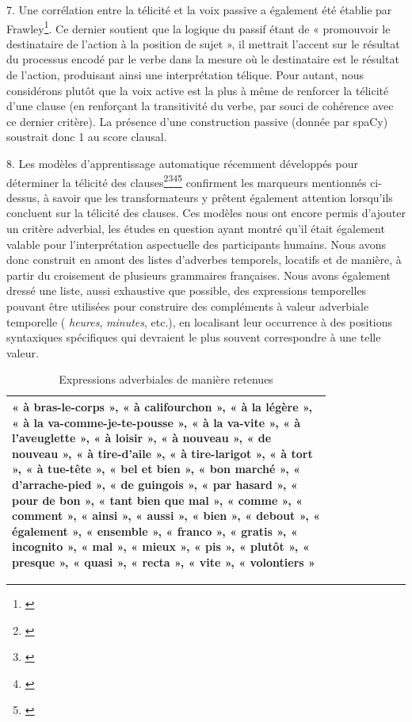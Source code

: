 7. Une corrélation entre la télicité et la voix passive a également été établie par Frawley\footnote{\cite{frawley_linguistic_1992}}. Ce dernier soutient que la logique du passif étant de « promouvoir le destinataire de l'action à la position de sujet », il mettrait l'accent sur le résultat du processus encodé par le verbe dans la mesure où le destinataire est le résultat de l'action, produisant ainsi une interprétation télique. Pour autant, nous considérons plutôt que la voix active est la plus à même de renforcer la télicité d'une clause (en renforçant la transitivité du verbe, par souci de cohérence avec ce dernier critère). La présence d'une construction passive (donnée par spaCy) soustrait donc 1 au score clausal.

8. Les modèles d'apprentissage automatique récemment développés pour déterminer la télicité des clauses\footnote{\cite{siegel_learning_2000}}\footnote{\cite{zarcone_computational_2008}}\footnote{\cite{friedrich_classification_2017}}\footnote{\cite{zhao_pretrained_2021}} confirment les marqueurs mentionnés ci-dessus, à savoir que les transformateurs y prêtent également attention lorsqu'ils concluent sur la télicité des clauses. Ces modèles nous ont encore permis d'ajouter un critère adverbial, les études en question ayant montré qu'il était également valable pour l'interprétation aspectuelle des participants humains. Nous avons donc construit en amont des listes d'adverbes temporels, locatifs et de manière, à partir du croisement de plusieurs grammaires françaises. Nous avons également dressé une liste, aussi exhaustive que possible, des expressions temporelles pouvant être utilisées pour construire des compléments à valeur adverbiale temporelle ( \textit{heures}, \textit{minutes}, etc.), en localisant leur occurrence à des positions syntaxiques spécifiques qui devraient le plus souvent correspondre à une telle valeur.

\begin{table}[H]
\caption{Expressions adverbiales de manière retenues}
\centering
\bigskip
\renewcommand{\arraystretch}{1.5} %
\begin{tabular}{|p{0.8\linewidth}|}
    \hline
    « à bras-le-corps », « à califourchon », « à la légère », « à la va-comme-je-te-pousse », « à la va-vite », « à l'aveuglette », « à loisir », « à nouveau », « de nouveau », « à tire-d'aile », « à tire-larigot », « à tort », « à tue-tête », « bel et bien », « bon marché », « d'arrache-pied », « de guingois », « par hasard », « pour de bon », « tant bien que mal », « comme », « comment », « ainsi », « aussi », « bien », « debout », « également », « ensemble », « franco », « gratis », « incognito », « mal », « mieux », « pis », « plutôt », « presque », « quasi », « recta », « vite », « volontiers »  \\
    \hline
\end{tabular}
 \label{Tab:adv_maniere}
\end{table}

